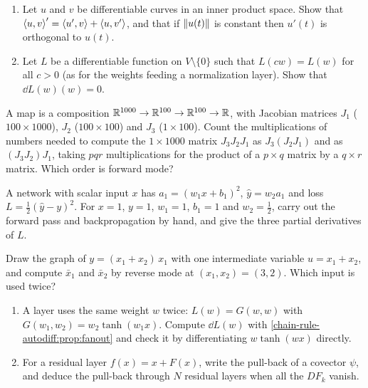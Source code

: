 \begin{notechapter}
\begin{exercise}\label{chain-rule-autodiff:exr:5}
\begin{enumerate}[nosep]
  \item Let $u$ and $v$ be differentiable curves in an inner product
        space. Show that
        $\left\langle u, v \right\rangle' = \left\langle u', v \right\rangle + \left\langle u, v' \right\rangle$, and that if
        $\left\|u(t)\right\|$ is constant then $u'(t)$ is orthogonal to $u(t)$.
  \item Let $L$ be a differentiable function on $V\setminus\{0\}$ such
        that $L(cw) = L(w)$ for all $c > 0$ (as for the weights feeding a
        normalization layer). Show that $\dd L(w)(w) = 0$.
\end{enumerate}
\end{exercise}

\begin{exercise}\label{chain-rule-autodiff:exr:6}
A map is a composition $\mathbb{R}^{1000}\to\mathbb{R}^{100}\to\mathbb{R}^{100}\to\mathbb{R}$, with
Jacobian matrices $J_1$ ($100\times1000$), $J_2$ ($100\times100$) and
$J_3$ ($1\times100$). Count the multiplications of numbers needed to
compute the $1\times1000$ matrix $J_3J_2J_1$ as $J_3(J_2J_1)$ and as
$(J_3J_2)J_1$, taking $pqr$ multiplications for the product of a
$p\times q$ matrix by a $q\times r$ matrix. Which order is forward mode?
\end{exercise}

\begin{exercise}\label{chain-rule-autodiff:exr:7}
A network with scalar input $x$ has $a_1 = (w_1x + b_1)^2$,
$\hat y = w_2a_1$ and loss $L = \frac12(\hat y - y)^2$. For $x = 1$,
$y = 1$, $w_1 = 1$, $b_1 = 1$ and $w_2 = \frac12$, carry out the forward
pass and backpropagation by hand, and give the three partial derivatives
of $L$.
\end{exercise}

\begin{exercise}\label{chain-rule-autodiff:exr:8}
Draw the graph of $y = (x_1 + x_2)\,x_1$ with one intermediate variable
$u = x_1 + x_2$, and compute $\bar x_1$ and $\bar x_2$ by reverse mode at
$(x_1, x_2) = (3, 2)$. Which input is used twice?
\end{exercise}

\begin{exercise}\label{chain-rule-autodiff:exr:9}
\begin{enumerate}[nosep]
  \item A layer uses the same weight $w$ twice:
        $L(w) = G(w, w)$ with $G(w_1, w_2) = w_2\tanh(w_1x)$. Compute
        $\dd L(w)$ with \cref{chain-rule-autodiff:prop:fanout} and check
        it by differentiating $w\tanh(wx)$ directly.
  \item For a residual layer $f(x) = x + F(x)$, write the pull-back of a
        covector $\psi$, and deduce the pull-back through $N$ residual
        layers when all the $DF_k$ vanish.
\end{enumerate}
\end{exercise}
\end{notechapter}
